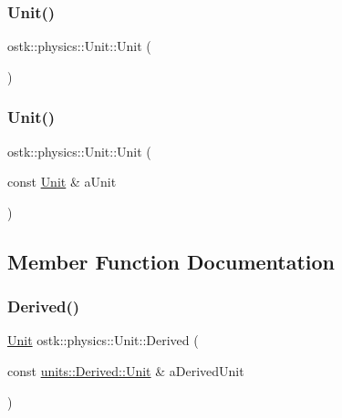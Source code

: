 \subsubsection{\texorpdfstring{Unit()}{Unit()}\hspace{0.1cm}{\footnotesize\ttfamily [1/2]}}
{\footnotesize\ttfamily ostk\+::physics\+::\+Unit\+::\+Unit (\begin{DoxyParamCaption}{ }\end{DoxyParamCaption})\hspace{0.3cm}{\ttfamily [delete]}}

\mbox{\label{classostk_1_1physics_1_1_unit_aaa79239cad3b8499ce9dc4ebec2b8f05}} 
\subsubsection{\texorpdfstring{Unit()}{Unit()}\hspace{0.1cm}{\footnotesize\ttfamily [2/2]}}
{\footnotesize\ttfamily ostk\+::physics\+::\+Unit\+::\+Unit (\begin{DoxyParamCaption}\item[{const \hyperlink{classostk_1_1physics_1_1_unit}{Unit} \&}]{a\+Unit }\end{DoxyParamCaption})}



\subsection{Member Function Documentation}
\mbox{\label{classostk_1_1physics_1_1_unit_af41e733d436f73949ab2fd9766071bdd}} 
\subsubsection{\texorpdfstring{Derived()}{Derived()}}
{\footnotesize\ttfamily \hyperlink{classostk_1_1physics_1_1_unit}{Unit} ostk\+::physics\+::\+Unit\+::\+Derived (\begin{DoxyParamCaption}\item[{const \hyperlink{classostk_1_1physics_1_1units_1_1_derived_1_1_unit}{units\+::\+Derived\+::\+Unit} \&}]{a\+Derived\+Unit }\end{DoxyParamCaption})\hspace{0.3cm}{\ttfamily [static]}}

